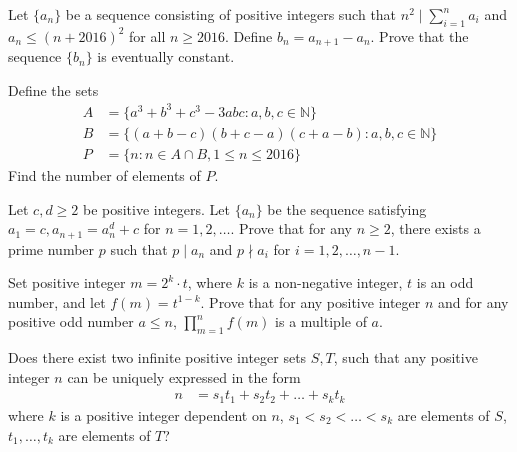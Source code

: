 \begin{problem}
	Let $\{ a_n\}$ be a sequence consisting of positive integers such that $n^2 \mid \sum_{i=1}^{n}{a_i}$ and $a_n\leq (n+2016)^2$ for all $n\geq 2016$.
	Define $b_n=a_{n+1}-a_n$. Prove that the sequence $\{ b_n\}$ is eventually constant. %
\end{problem}

\begin{problem}
	Define the sets
	\begin{align*}
		A &=\{a^3+b^3+c^3-3abc:a,b,c\in\mathbb{N}\}\\
		B &=\{(a+b-c)(b+c-a)(c+a-b):a,b,c\in\mathbb{N}\}\\
		P &=\{n:n\in A\cap B,1\le n\le 2016\}
	\end{align*}
	Find the number of elements of $P$. %
\end{problem}

\begin{problem}
	Let $c,d \geq 2$ be positive integers. Let $\{a_n\}$ be the sequence satisfying $a_1 = c, a_{n+1} = a_n^d + c$ for $n = 1,2,\dots$.
	Prove that for any $n \geq 2$, there exists a prime number $p$ such that $p\mid a_n$ and $p \nmid a_i$ for $i = 1,2,\dots, n-1$. %
\end{problem}

\begin{problem}
	Set positive integer $m=2^k\cdot t$, where $k$ is a non-negative integer, $t$ is an odd number, and let $f(m)=t^{1-k}$. Prove that for any positive integer $n$ and for any positive odd number $a\le n$, $\prod_{m=1}^n f(m)$ is a multiple of $a$. %
\end{problem}

\begin{problem}
	Does there exist two infinite positive integer sets $S,T$, such that any positive integer $n$ can be uniquely expressed in the form
		\begin{align*}
			n
				& =s_1t_1+s_2t_2+\ldots+s_kt_k
		\end{align*}
	where $k$ is a positive integer dependent on $n$, $s_1<s_2<\dots<s_k$ are elements of $S$, $t_1,\dots, t_k$ are elements of $T$? %
\end{problem}

